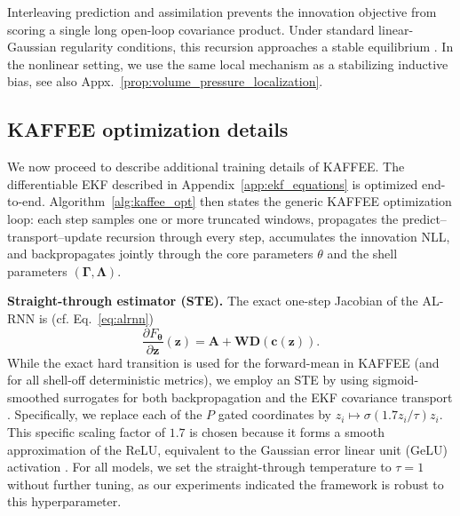 \documentclass{article}
\theoremstyle{plain}
\theoremstyle{definition}
\theoremstyle{remark}
\begin{document}
Interleaving prediction and assimilation prevents the innovation objective from scoring a single long open-loop covariance product. Under standard linear-Gaussian regularity conditions, this recursion approaches a stable equilibrium \citep{reif1999stochastic}. In the nonlinear setting, we use the same local mechanism as a stabilizing inductive bias, see also Appx.~\ref{prop:volume_pressure_localization}.

\subsection{KAFFEE optimization details}
\label{app:kaffee_opt_details}
We now proceed to describe additional training details of KAFFEE. The differentiable EKF described in Appendix~\ref{app:ekf_equations} is optimized end-to-end. Algorithm~\ref{alg:kaffee_opt} then states the generic KAFFEE optimization loop: each step samples one or more truncated windows, propagates the predict--transport--update recursion through every step, accumulates the innovation NLL, and backpropagates jointly through the core parameters $\theta$ and the shell parameters $(\bm \Gamma,\bm \Lambda)$.

\textbf{Straight-through estimator (STE).} The exact one-step Jacobian of the AL-RNN is (cf. Eq.~\ref{eq:alrnn})
\[
\frac{\partial F_{\bm\theta}}{\partial \bm z}(\bm z)
=
\bm A+\bm W\bm D(\bm c(\bm z)).
\]
While the exact hard transition is used for the forward-mean in KAFFEE (and for all shell-off deterministic metrics), we employ an STE by using sigmoid-smoothed surrogates for both backpropagation and the EKF covariance transport \citep{bengio2013estimating}. Specifically, we replace each of the $P$ gated coordinates by $z_i \mapsto \sigma(1.7 z_i/\tau)z_i$. This specific scaling factor of $1.7$ is chosen because it forms a smooth approximation of the ReLU, equivalent to the Gaussian error linear unit (GeLU) activation \citep{hendrycks2023gaussian}. For all models, we set the straight-through temperature to $\tau = 1$ without further tuning, as our experiments indicated the framework is robust to this hyperparameter.
\end{document}
